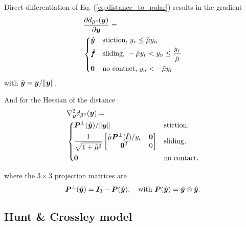 Direct differentiation of Eq. (\ref{eq:distance_to_polar}) results in the
gradient
\begin{align}
	&\frac{\partial{d_{\tilde{\mu}^\circ}(\vf{y})}}{\partial\vf{y}} = 
	\label{eq:gradient_distance_to_polar}\\
&\begin{dcases}
	\hat{\vf{y}} & \text{stiction, } y_r \le \tilde\mu y_n\\
	\hat{\vf{f}} & \text{sliding, } -\tilde\mu y_r < y_n \leq \frac{y_r}{\tilde\mu}\\
    \vf{0} & \text{no contact, } y_n < -\tilde\mu y_r
\end{dcases}\nonumber
\end{align}
with $\hat{{\bm{y}}}={\bm{y}}/\Vert{\bm{y}}\Vert$.

And for the Hessian of the distance
\begin{align}
	&\nabla_\vf{y}^2 d_{\tilde{\mu}^\circ}(\vf{y}) = 
	\label{eq:hessian_distance_to_polar}\\
&\begin{dcases}
	\vf{P}^\perp(\hat{\vf{y}})/\Vert\vf{y}\Vert & 
	\text{stiction,}\\
	\frac{1}{\sqrt{1+\tilde\mu^2}}
	\begin{bmatrix}
		\tilde\mu\vf{P}^\perp(\hat{\vf{t}})/y_r & 
		\vf{0}\\
		\vf{0}^T & 
		0\\
	\end{bmatrix} &
	\text{sliding,}\\
    \vf{0} & \text{no contact.}
\end{dcases}\nonumber
\end{align}

where the $3\times 3$ projection matrices are
\begin{equation*}
	{\bm{P}}^\perp(\hat{{\bm{y}}})={\bm{I}}_3 - {\bm{P}}(\hat{{\bm{y}}}),
	\quad\text{with }
	{\bm{P}}(\hat{{\bm{y}}}) = \hat{{\bm{y}}}\otimes\hat{{\bm{y}}}\nonumber.
\end{equation*}

\subsection{Hunt \& Crossley model}

